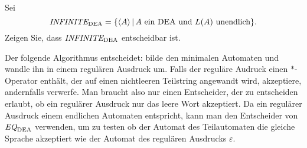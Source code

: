 Sei
\[
\text{\it INFINITE}_{\text{DEA}}
=
\{
\langle A\rangle\,|\,\text{$A$ ein DEA und $L(A)$ unendlich}
\}.
\]
Zeigen Sie, dass $\text{\it INFINITE}_{\text{DEA}}$
entscheidbar ist.

\begin{loesung}
Der folgende Algorithmus entscheidet: bilde den minimalen Automaten und
wandle ihn in einem regulären Ausdruck um. Falls der reguläre
Audruck einen $*$-Operator enthält, der auf einen nichtleeren
Teilstring angewandt wird, akzeptiere, andernfalls verwerfe.
Man braucht also nur einen Entscheider, der  zu entscheiden erlaubt,
ob ein regulärer Ausdruck nur das leere Wort akzeptiert. Da ein
regulärer Ausdruck einem endlichen Automaten entspricht, kann man
den Entscheider von $\text{\it EQ}_{\text{DEA}}$ verwenden, um zu
testen ob der Automat des Teilautomaten die gleiche Sprache akzeptiert
wie der Automat des regulären Ausdrucks $\varepsilon$.
\end{loesung}
